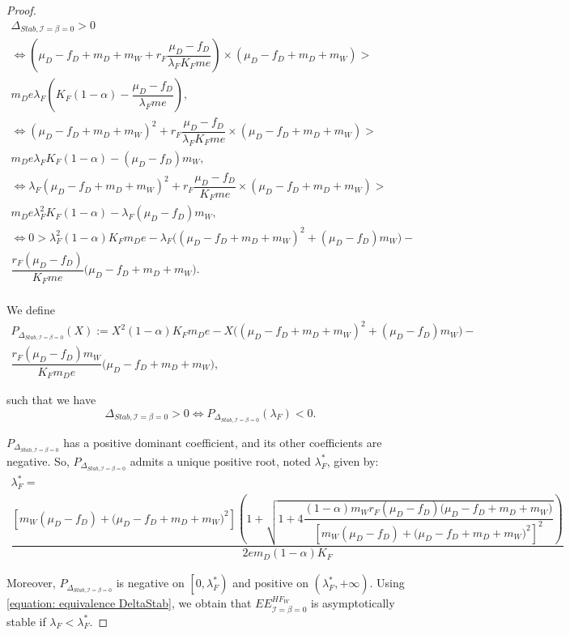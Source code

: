 \documentclass{article}
\newcommand{\lfw}{\lambda_{F}}
\newcommand{\lfw}{\lambda_{F}}
\newcommand{\cI}{\mathcal{I}}
\begin{document}
\begin{appendix}
\begin{proof}
\begin{multline*}
\Delta_{Stab, \cI=\beta = 0} > 0 \\
\Leftrightarrow \left(\mu_D - f_D + m_D + m_W + r_F \dfrac{\mu_D - f_D}{\lfw K_F m e} \right) \times   \left( \mu_D -f_D + m_D + m_W \right) > \\ m_D e \lfw \left(K_F(1-\alpha) - \dfrac{\mu_D - f_D}{\lfw m e} \right), \\
\Leftrightarrow (\mu_D - f_D + m_D + m_W)^2 + r_F \dfrac{\mu_D - f_D}{\lfw K_F m e}  \times   \left( \mu_D -f_D + m_D + m_W \right) > \\ m_D e \lfw K_F(1-\alpha) - (\mu_D - f_D)m_W , \\
\Leftrightarrow \lfw (\mu_D - f_D + m_D + m_W)^2 + r_F \dfrac{\mu_D - f_D}{K_F m e}  \times   \left( \mu_D -f_D + m_D + m_W \right) > \\ m_D e \lfw^2 K_F(1-\alpha) - \lfw (\mu_D - f_D)m_W , \\
\Leftrightarrow 0 > \lfw^2 (1-\alpha) K_F  m_D e - \lfw \Big((\mu_D - f_D + m_D + m_W)^2 +(\mu_D - f_D)m_W \Big) - \\ \dfrac{r_F (\mu_D - f_D) }{K_F m e}  \big( \mu_D -f_D + m_D + m_W \big).\\
\end{multline*}

We define 
\begin{multline*}
P_{\Delta_{Stab, \cI= \beta = 0}}(X) := X^2 (1-\alpha) K_F  m_D e - X \Big((\mu_D - f_D + m_D + m_W)^2 +(\mu_D - f_D)m_W \Big) - \\ \dfrac{r_F (\mu_D - f_D) m_W}{K_F m_D e}  \big( \mu_D -f_D + m_D + m_W \big),
\end{multline*} 

such that we have 
\begin{equation}
\Delta_{Stab, \cI= \beta = 0} > 0 \Leftrightarrow P_{\Delta_{Stab, \cI= \beta = 0}}(\lfw) < 0.
\label{equation: equivalence DeltaStab}
\end{equation}

$P_{\Delta_{Stab, \cI = \beta = 0}}$ has a positive dominant coefficient, and its other coefficients are negative. So,  $P_{\Delta_{Stab, \cI= \beta = 0}}$ admits a unique positive root, noted $\lfw^*$, given by:
\begin{multline}
\lfw^* = \\
 \dfrac{\left[m_{W}(\mu_{D}-f_{D})+\big(\mu_{D}-f_{D}+m_{D}+m_{W})^{2}\right]\left(1+\sqrt{1+4\dfrac{(1-\alpha)m_{W}r_{F}\left(\mu_{D}-f_{D}\right)\big(\mu_{D}-f_{D}+m_{D}+m_{W})}{\left[m_{W}(\mu_{D}-f_{D})+\big(\mu_{D}-f_{D}+m_{D}+m_{W})^{2}\right]^{2}}}\right)}{2em_D (1-\alpha) K_F }
\end{multline}

Moreover, $P_{\Delta_{Stab, \cI = \beta = 0}}$ is negative on $\left[0, \lfw^* \right)$ and positive on $\left(\lfw ^*, +\infty \right)$. Using \eqref{equation: equivalence DeltaStab}, we obtain that $EE^{HF_W}_{\cI = \beta = 0}$ is asymptotically stable if $\lfw  < \lfw ^*$.
\end{proof}

\end{appendix}



\newpage



\end{document}
